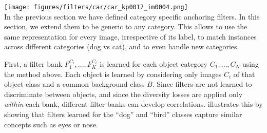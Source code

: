 \documentclass[10pt,twocolumn,letterpaper]{article}
\begin{document}
	\texttt{[image: figures/filters/car/car\_kp0017\_im0004.png]}\\%

In the previous section we have defined category specific anchoring filters.  In this section, we extend them to be generic to any category.
This allows to use the same representation for every image, irrespective of its label,
to match instances across different categories (\eg dog vs cat), and to even handle new categories.

First, a filter bank $F_1^{C_i}, ..., F_K^{C_i}$ is learned for each object category $C_1,\dots,C_N$ using the method above. Each object is learned by considering only images $C_i$ of that object class and a common background class $B$. Since filters are not learned to discriminate between objects, and since the diversity losses are applied only \emph{within} each bank, different filter banks can develop correlations.  illustrates this by showing that filters learned for the ``dog'' and ``bird'' classes capture similar concepts such as eyes or nose.
\end{document}

